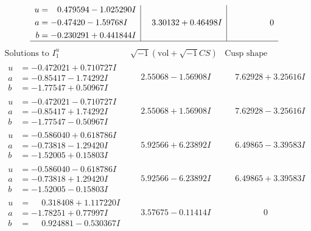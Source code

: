 \documentclass[1p]{elsarticle_modified}
\theoremstyle{definition}
\newcommand{\I}{\sqrt{-1}}
\begin{document}
$$\begin{array}{c|c|c}
\begin{aligned}
u &= \phantom{-}0.479594 - 1.025290 I \\
a &= -0.47420 - 1.59768 I \\
b &= -0.230291 + 0.441844 I\end{aligned}
 & \phantom{-}3.30132 + 0.46498 I & \phantom{-0.000000 } 0\\
 \hline 
 \end{array}$$\newpage$$\begin{array}{c|c|c}  
\text{Solutions to }I^u_{1}& \I (\text{vol} + \sqrt{-1}CS) & \text{Cusp shape}\\
 \hline 
\begin{aligned}
u &= -0.472021 + 0.710727 I \\
a &= -0.85417 - 1.74292 I \\
b &= -1.77547 + 0.50967 I\end{aligned}
 & \phantom{-}2.55068 - 1.56908 I & \phantom{-}7.62928 + 3.25616 I \\ \hline\begin{aligned}
u &= -0.472021 - 0.710727 I \\
a &= -0.85417 + 1.74292 I \\
b &= -1.77547 - 0.50967 I\end{aligned}
 & \phantom{-}2.55068 + 1.56908 I & \phantom{-}7.62928 - 3.25616 I \\ \hline\begin{aligned}
u &= -0.586040 + 0.618786 I \\
a &= -0.73818 - 1.29420 I \\
b &= -1.52005 + 0.15803 I\end{aligned}
 & \phantom{-}5.92566 + 6.23892 I & \phantom{-}6.49865 - 3.39583 I \\ \hline\begin{aligned}
u &= -0.586040 - 0.618786 I \\
a &= -0.73818 + 1.29420 I \\
b &= -1.52005 - 0.15803 I\end{aligned}
 & \phantom{-}5.92566 - 6.23892 I & \phantom{-}6.49865 + 3.39583 I \\ \hline\begin{aligned}
u &= \phantom{-}0.318408 + 1.117220 I \\
a &= -1.78251 + 0.77997 I \\
b &= \phantom{-}0.924881 - 0.530367 I\end{aligned}
 & \phantom{-}3.57675 - 0.11414 I & \phantom{-0.000000 } 0 \\ \hline\begin{aligned}

\end{aligned}
\end{array}$$
\end{document}
